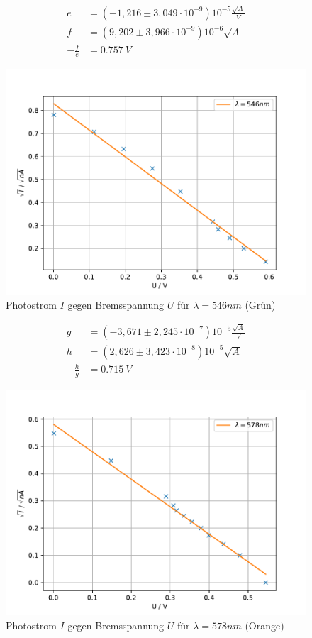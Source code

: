 \FloatBarrier
\begin{align*}
  e &= (-1,216 \pm 3,049 \cdot 10^{-9}) 10^{-5}\si{\frac{\sqrt{A}}{V}}\\
  f &= (9,202 \pm 3,966 \cdot 10^{-9}) 10^{-6}\si{\sqrt{A}}\\
  -\frac{f}{e} &= \SI{0.757}{V}
\end{align*}
\FloatBarrier

\FloatBarrier
\begin{figure}[h!]
  \centering
  \includegraphics[width=\textwidth]{Gruen546.pdf}
  \caption{Photostrom $I$ gegen Bremsspannung $U$ für $\lambda=546nm$ (Grün)}
  \label{fig:g546}
\end{figure}
\FloatBarrier
\begin{align*}
  g &= (-3,671 \pm 2,245 \cdot 10^{-7}) 10^{-5}\si{\frac{\sqrt{A}}{V}}\\
  h &= (2,626 \pm 3,423 \cdot 10^{-8}) 10^{-5}\si{\sqrt{A}}\\
  -\frac{h}{g} &= \SI{0.715}{V}
\end{align*}
\FloatBarrier

\FloatBarrier
\begin{figure}[h!]
  \centering
  \includegraphics[width=\textwidth]{Orange578.pdf}
  \caption{Photostrom $I$ gegen Bremsspannung $U$ für $\lambda=578nm$ (Orange)}
  \label{fig:o578}
\end{figure}
